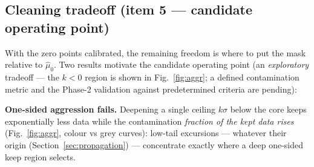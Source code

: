 
\subsection{Cleaning tradeoff (item 5 --- candidate operating point)}
\label{sec:cleaning}

With the zero points calibrated, the remaining freedom is where to put the
mask relative to $\hat\mu_0$. Two results motivate the candidate
operating point (an \emph{exploratory} tradeoff --- the $k<0$ region is
shown in Fig.~\ref{fig:aggr}; a defined contamination metric and the
Phase-2 validation against predetermined criteria are pending):

\textbf{One-sided aggression fails.} Deepening a single ceiling $k\sigma$
below the core keeps exponentially less data while the contamination
\emph{fraction of the kept data rises} (Fig.~\ref{fig:aggr}, colour
vs grey curves): low-tail
excursions --- whatever their origin (Section~\ref{sec:propagation}) ---
concentrate exactly where a deep one-sided keep region selects.

